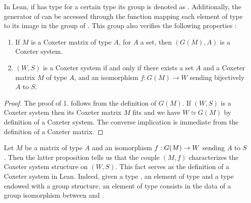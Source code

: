 In Lean, if  has type  for a certain type  its group is denoted as . Additionally, the generator of  can be accessed through the function  mapping each element of type \lean{\B} to its image in the group of . This group also verifies the following properties :

\begin{propriete}

\begin{enumerate}
    \item If $M$ is a Coxeter matrix of type $A$, for $A$ a set, then $\left( G\left( M \right),A \right)$ is a Coxeter system.
    \item $\left( W,S \right)$ is a Coxeter system if and only if there exists a set $A$ and a Coxeter matrix $M$ of type $A$, and an isomorphism $f : G\left( M \right) \to W$ sending bijectively $A$ to $S$. 
\end{enumerate}
\end{propriete}
   
\begin{proof}

The proof of 1. follows from the definition of $G\left( M \right)$.
If $\left( W,S \right)$ is a Coxeter system then its Coxeter matrix $M$ fits and we have $ W \simeq G(M)$ by definition of a Coxeter system. The converse implication is immediate from the definition of a Coxeter matrix.

\end{proof}
Let $M$ be a matrix of type $A$ and an isomorphism $f : G(M) \to W$ sending $A$ to $S$. Then the latter proposition tells us that the couple $\left( M,f \right)$ characterizes the Coxeter system structure on $\left( W,S \right)$. This fact serves as the definition of a Coxeter system in Lean. 
Indeed, given a type , an element  of type  and a type  endowed with a group structure, an element of type  consists in the data of a group isomorphism between  and .

